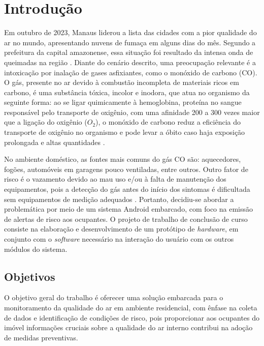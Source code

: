 \chapter{Introdução}

Em outubro de 2023, Manaus liderou a lista das cidades com a pior qualidade do ar no mundo, apresentando nuvens de fumaça em alguns dias do mês. Segundo a prefeitura da capital amazonense, essa situação foi resultado da intensa onda de queimadas na região \cite{G1-ar-manaus}. Diante do cenário descrito, uma preocupação relevante é a intoxicação por inalação de gases asfixiantes, como o monóxido de carbono (CO). O gás, presente no ar devido à combustão incompleta de materiais ricos em carbono, é uma substância tóxica, incolor e inodora, que atua no organismo da seguinte forma: ao se ligar quimicamente à hemoglobina, proteína no sangue responsável pelo transporte de oxigênio, com uma afinidade 200 a 300 vezes maior que a ligação do oxigênio ($O_{2}$), o monóxido de carbono reduz a eficiência do transporte de oxigênio no organismo e pode levar a óbito caso haja exposição prolongada e altas quantidades \cite{carbon-monoxide-poisoning-varon}.

No ambiente doméstico, as fontes mais comuns do gás CO são: aquecedores, fogões, automóveis em garagens pouco ventiladas, entre outros. Outro fator de risco é o vazamento devido ao mau uso e/ou à falta de manutenção dos equipamentos, pois a detecção do gás antes do início dos sintomas é dificultada sem equipamentos de medição adequados \cite{bio-sufocantes-hernandez2022}. Portanto, decidiu-se abordar a problemática por meio de um sistema Android embarcado, com foco na emissão de alertas de risco aos ocupantes. O projeto de trabalho de conclusão de curso consiste na elaboração e desenvolvimento de um protótipo de \textit{hardware}, em conjunto com o \textit{software} necessário na interação do usuário com os outros módulos do sistema. 

\section{Objetivos}

O objetivo geral do trabalho é oferecer uma solução embarcada para o monitoramento da qualidade do ar em ambiente residencial, com ênfase na coleta de dados e identificação de condições de risco, pois proporcionar aos ocupantes do imóvel informações cruciais sobre a qualidade do ar interno contribui na adoção de medidas preventivas.

